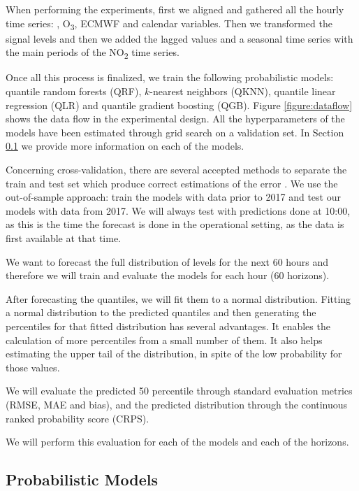 \documentclass[a4paper,3p,sort&compress]{elsarticle}
\begin{document}
When performing the experiments, first we aligned and gathered all the
hourly time series: \no, O\textsubscript{3}, ECMWF and
calendar variables.  Then we transformed the signal levels and then we
added the lagged values and a seasonal time series with the main
periods of the NO\textsubscript{2} time series.

Once all this process is finalized, we train the following
probabilistic models: quantile random forests (QRF), $k$-nearest
neighbors (QKNN), quantile linear regression (QLR) and quantile
gradient boosting (QGB).  Figure \ref{figure:dataflow} shows the data
flow in the experimental design. All the hyperparameters of the models
have been estimated through grid search on a validation set.  
In Section \ref{sec:models}
we provide more information on each of the models.

Concerning cross-validation, there are several accepted methods to
separate the train and test set which produce correct estimations of
the error \cite{bergmeir_note_2018}. We use the out-of-sample
approach: train the models with data prior to 2017 and test our models
with data from 2017. We will always test with predictions done at
10:00, as this is the time the forecast is done in the operational
setting, as the data is first available at that time.

We want to forecast the full distribution of \no
levels for the next 60 hours and therefore we will train and evaluate
the models for each hour (60 horizons).

After forecasting the quantiles, we will fit them to a normal
distribution. Fitting a normal distribution to the predicted quantiles
and then generating the percentiles for that fitted distribution has
several advantages. It enables the calculation of more percentiles
from a small number of them.  It also helps estimating the upper tail
of the distribution, in spite of the low probability for those values.

We will evaluate the predicted 50 percentile through standard
evaluation metrics (RMSE, MAE and bias), and the predicted
distribution through the continuous ranked probability score (CRPS).

We will perform this evaluation for
each of the models and each of the horizons.

\subsection{Probabilistic Models}
\label{sec:models}
\end{document}
